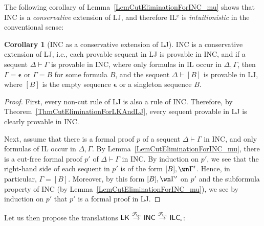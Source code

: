 \documentclass[a4paper]{article}
\theoremstyle{definition}
\theoremstyle{theorem}
\newtheorem{corollary}[definition]{Corollary}
\theoremstyle{remark}
\begin{document}
The following corollary of Lemma~\ref{LemCutEliminationForINC_mu} shows that \textsf{INC} is a \emph{conservative} extension of \textsf{LJ}, and therefore IL$^{\text{e}}$ is \emph{intuitionistic} in the conventional sense:
\begin{corollary}[\textsf{INC} as a conservative extension of \textsf{LJ}]
\label{CorINCAsAConservativeExtensionOfLJ}
\textsf{INC} is a conservative extension of \textsf{LJ}, i.e., each provable sequent in \textsf{LJ} is provable in \textsf{INC}, and if a sequent $\Delta \vdash \Gamma$ is provable in \textsf{INC}, where only formulas in IL occur in $\Delta, \Gamma$, then $\Gamma = \boldsymbol{\epsilon}$ or $\Gamma = B$ for some formula $B$, and the sequent $\Delta \vdash [B]$ is provable in \textsf{LJ}, where $[B]$ is the empty sequence $\boldsymbol{\epsilon}$ or a singleton sequence $B$.
\end{corollary}
\begin{proof}
First, every non-cut rule of \textsf{LJ} is also a rule of \textsf{INC}.
Therefore, by Theorem~\ref{ThmCutEliminationForLKAndLJ}, every sequent provable in \textsf{LJ} is clearly provable in \textsf{INC}.

Next, assume that there is a formal proof $p$ of a sequent $\Delta \vdash \Gamma$ in \textsf{INC}, and only formulas of IL occur in $\Delta, \Gamma$.
By Lemma~\ref{LemCutEliminationForINC_mu}, there is a cut-free formal proof $p'$ of $\Delta \vdash \Gamma$ in \textsf{INC}.
By induction on $p'$, we see that the right-hand side of each sequent in $p'$ is of the form $[B], \wn \Gamma'$.
Hence, in particular, $\Gamma = [B]$.
Moreover, by this form $[B], \wn \Gamma'$ on $p'$ and the subformula property of \textsf{INC} (by Lemma~\ref{LemCutEliminationForINC_mu}), we see by induction on $p'$ that $p'$ is a formal proof in \textsf{LJ}.
\end{proof}

Let us then propose the translations $\textsf{LK} \stackrel{\mathscr{T}_{\wn}}{\rightarrow} \textsf{INC} \stackrel{\mathscr{T}_{\oc}}{\rightarrow} \textsf{ILC$_\iota$}$:
\end{document}
